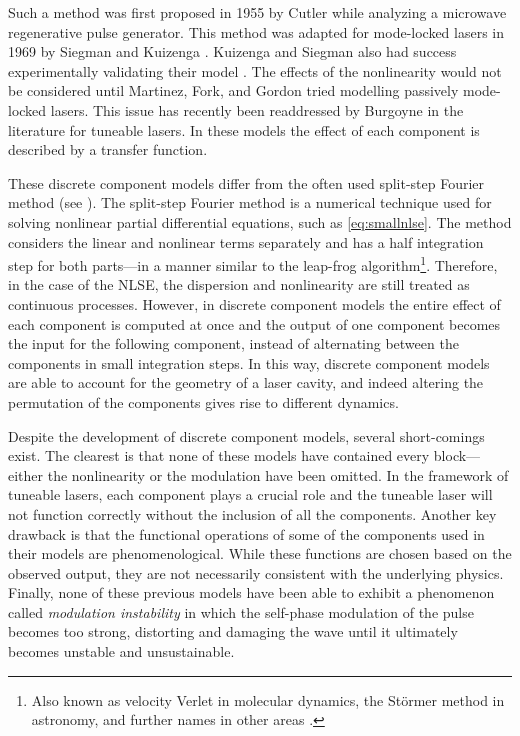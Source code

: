 \documentclass[graybox]{svmult}
\begin{document}
Such a method was first proposed in 1955 by Cutler \cite{cutler} while analyzing a microwave regenerative pulse generator. This method was adapted for mode-locked lasers in 1969 by Siegman and Kuizenga \cite{kuizenga1970a, siegman}. Kuizenga and Siegman also had success experimentally validating their model \cite{kuizenga1970b, kuizenga1970}. The effects of the nonlinearity would not be considered until Martinez, Fork, and Gordon \cite{martinez1984, martinez1985} tried modelling passively mode-locked lasers. This issue has recently been readdressed by Burgoyne \cite{burgoyne2014} in the literature for tuneable lasers. In these models the effect of each component is described by a transfer function.

These discrete component models differ from the often used split-step Fourier method (see \cite{agrawal2013, taha1984}). The split-step Fourier method is a numerical technique used for solving nonlinear partial differential equations, such as \eqref{eq:smallnlse}. The method considers the linear and nonlinear terms separately and has a half integration step for both parts---in a manner similar to the leap-frog algorithm\footnote{Also known as velocity Verlet in molecular dynamics, the St\"{o}rmer method in astronomy, and further names in other areas \cite{hairer2006}.}. Therefore, in the case of the NLSE, the dispersion and nonlinearity are still treated as continuous processes. However, in discrete component models the entire effect of each component is computed at once and the output of one component becomes the input for the following component, instead of alternating between the components in small integration steps. In this way, discrete component models are able to account for the geometry of a laser cavity, and indeed altering the permutation of the components gives rise to different dynamics.

Despite the development of discrete component models, several short-comings exist. The clearest is that none of these models have contained every block---either the nonlinearity or the modulation have been omitted. In the framework of tuneable lasers, each component plays a crucial role and the tuneable laser will not function correctly without the inclusion of all the components. Another key drawback is that the functional operations of some of the components used in their models are phenomenological. While these functions are chosen based on the observed output, they are not necessarily consistent with the underlying physics. Finally, none of these previous models have been able to exhibit a phenomenon called \emph{modulation instability} in which the self-phase modulation of the pulse becomes too strong, distorting and damaging the wave until it ultimately becomes unstable and unsustainable.
\end{document}
